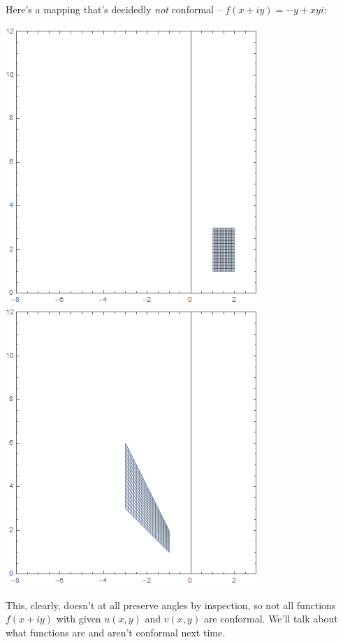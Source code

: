 Here's a mapping that's decidedly \textit{not} conformal -- $f(x + iy) = -y + xyi$:
\begin{center}
    \includegraphics[scale=0.5]{images/domzsqr.png}
    \includegraphics[scale=0.5]{images/ranzsqr2.png}
\end{center}
This, clearly, doesn't at all preserve angles by inspection, so not all functions $f(x+iy)$ with given $u(x, y)$ and $v(x,y)$ are conformal. We'll talk about what functions are and aren't conformal next time.

